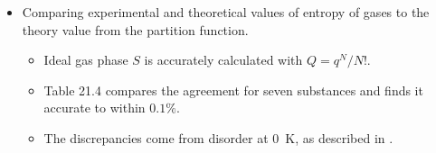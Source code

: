 \documentclass[../notes.tex]{subfiles}
\begin{document}
\begin{itemize}
\begin{itemize}
    \end{itemize}
    \item Comparing experimental and theoretical values of entropy of gases to the theory value from the partition function.
    \begin{itemize}
        \item Ideal gas phase $S$ is accurately calculated with $Q=q^N/N!$.
        \item Table 21.4 compares the agreement for seven substances and finds it accurate to within $0.1\%$.
        \item The discrepancies come from disorder at \SI{0}{\kelvin}, as described in \textcite{bib:McQuarrieSimon}.
    \end{itemize}
\end{itemize}
\end{document}

